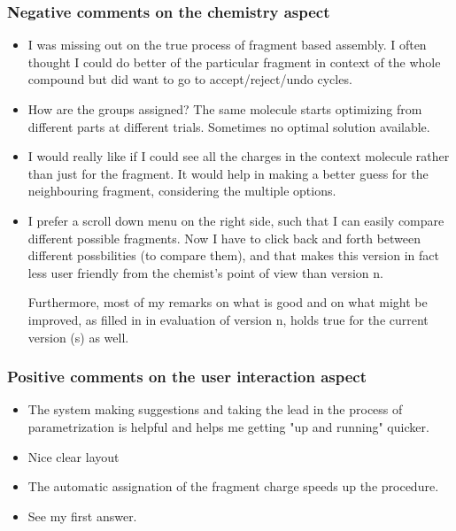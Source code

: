 \subsubsection{Negative comments on the chemistry aspect}
\begin{itemize}
\item I was missing out on the true process of fragment based assembly. I often thought I could do better of the particular fragment in context of the whole compound but did want to go to accept/reject/undo cycles. 

\item How are the groups assigned? The same molecule starts optimizing from different parts at different trials. Sometimes no optimal solution available. 

\item I would really like if I could see all the charges in the context molecule rather than just for the fragment. It would help in making a better guess for the neighbouring fragment, considering the multiple options. 

\item I prefer a scroll down menu on the right side, such that I can easily compare different possible fragments. Now I have to click back and forth between different possbilities (to compare them), and that makes this version in fact less user friendly from the chemist's point of view than version n.

Furthermore, most of my remarks on what is good and on what might be improved, as filled in in evaluation of version n, holds true for the current version (s) as well.

\end{itemize}


\subsubsection{Positive comments on the user interaction aspect}
\begin{itemize}
\item The system making suggestions and taking the lead in the process of parametrization is helpful and helps me getting "up and running" quicker. 



\item Nice clear layout

\item The automatic assignation of the fragment charge speeds up the procedure.

\item See my first answer.

\end{itemize}


